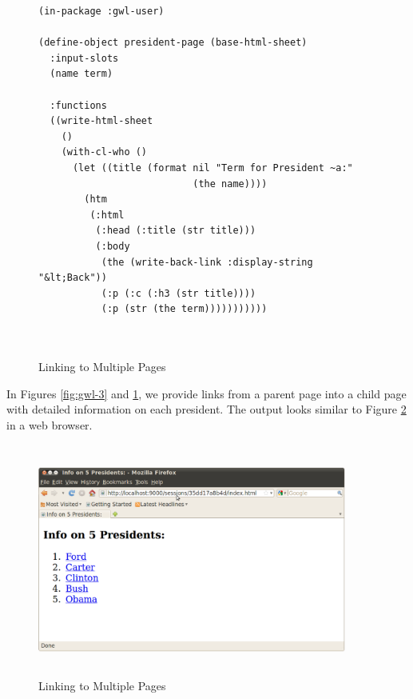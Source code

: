 \documentclass [11pt]{book}
\begin{document}
\begin{figure}
\begin{lrbox}{\boxedverb}
\begin{minipage}{\linewidth}
\tiny{

\begin{verbatim}(in-package :gwl-user)

(define-object president-page (base-html-sheet)
  :input-slots
  (name term)
  
  :functions
  ((write-html-sheet
    ()
    (with-cl-who ()
      (let ((title (format nil "Term for President ~a:" 
                           (the name))))
        (htm
         (:html 
          (:head (:title (str title)))
          (:body 
           (the (write-back-link :display-string "&lt;Back"))
           (:p (:c (:h3 (str title))))
           (:p (str (the term)))))))))))

      

\end{verbatim}}
\end{minipage}
\end{lrbox}
\fbox{\usebox{\boxedverb}}

\caption{Linking to Multiple Pages}

\label{fig:gwl-3a}

\end{figure}
 In Figures 
\ref{fig:gwl-3} and 
\ref{fig:gwl-3a}, we provide links from a parent page into a child page
with detailed information on each president. The output looks similar
to Figure 
\ref{fig:gwl-3-image} in a web browser.
\begin{figure}
\begin{center}
\includegraphics[width=4in,height=3in]{../images/gwl-3.png}
\end{center}

\caption{Linking to Multiple Pages}

\label{fig:gwl-3-image}

\end{figure}
\end{document}
